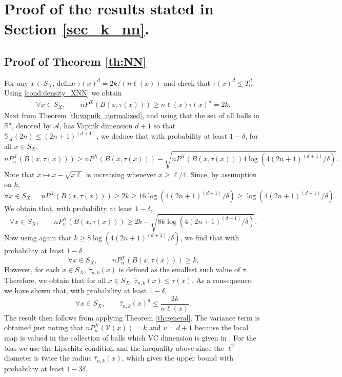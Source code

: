\documentclass[paper=a4, fontsize=11pt]{scrartcl}
\begin{document}
\section{Proof of the results stated in Section \ref{sec_k_nn}.}

\subsection*{Proof of Theorem \ref{th:NN}}

For any $x\in S_X$, define $ \tau(x)^d  = 2 k /  (n \ell(x) ) $  and check that  $\tau(x)^d \leq T_0^d$. Using \ref{cond:density_XNN} we obtain 
   \begin{align*}
    \forall x\in S_X,\qquad   n P^X(B (x, \tau(x)) ) \geq n \ell(x) \tau(x)^d   = 2  k .
   \end{align*}
   Next from Theorem \ref{th:vapnik_normalized}, and using that the set of all balls in $\mathbb R^d$, denoted by $\mathcal{A}$, has Vapnik dimension $d+1$ so that $\mathbb S_\mathcal A(2n)\leq (2n+1)^{(d+1)} $,  we deduce that with probability at least $1-\delta$, for all $x \in S_X,$
   $$n P_n^X (B (x, \tau(x)) ) \geq n P^X(B (x, \tau(x)) ) - \sqrt { n P^X(B (x, \tau(x)) )  4\log( 4 (2n+1)^{(d+1)}  / \delta)   } . $$
   Note that $x\mapsto x - \sqrt{ x\ell} $ is increasing whenever $ x\geq \ell /4$. Since, by assumption on $k$, 
   $$\forall x\in S_X,\quad  n P^X(B (x, \tau(x)) ) \geq  2k \geq 16\log( 4 (2n+1)^{(d+1)}  / \delta) \geq \log( 4 (2n+1)^{(d+1)}  / \delta).   $$
   We obtain that, with probability at least $1-\delta$,
   $$ \forall x\in S_X,\qquad    n P_n^X (B (x, \tau(x)) ) \geq 2k - \sqrt {8k  \log( 4  (2n+1)^{(d+1)}  / \delta)   }  .$$
   Now using again that $k \geq  {  8 \log( 4 (2n+1)^{(d+1)} / \delta)   }  $, we find that with probability at least $1-\delta$
   $$ \forall x\in S_X,\qquad  nP_n^X(B (x, \tau(x)))\geq k .$$
   However, for each $x\in S_X$, $\hat \tau _{n,k}(x) $ is defined as the smallest such value of $\tau $. Therefore, we obtain that for all $x \in S_X$, $ \hat \tau_{n,k} (x)  \leq \tau (x)$. As a consequence, we have shown that, with probability at least $1-\delta$, 
   $$ \forall x\in S_X,\qquad  \hat \tau_{n,k}(x) ^d \leq \frac{ 2 k  }{ n \ell(x)  }.$$
The result then follows from applying Theorem \ref{th:general}. The variance term is obtained just noting that $n P_n^X (\mathcal V (x) ) = k$ and $v = d+1 $ because the local map is valued in the collection of balls which VC dimension is given in \cite{wenocur1981some}. For the bias we use the Lipschitz condition and the inequality above since the \(\ell^2\)-diameter is twice the radius \(\hat \tau_{n,k}(x)\), which gives the upper bound with probability at least \(1 - 3\delta\).
\end{document}

